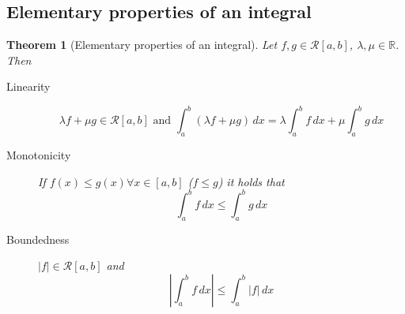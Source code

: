 \documentclass{article}
\newtheorem{theorem}{Theorem}  \numberwithin{theorem}{section}
\newcommand{\card}[1]{\left|#1\right|}
\begin{document}
\subsection{Elementary properties of an integral}

\begin{theorem}[Elementary properties of an integral]
  Let $f, g \in \mathcal R[a,b]$, $\lambda, \mu \in \mathbb R$.
  Then
  \begin{description}
    \item[Linearity]
      \[ \lambda f + \mu g \in \mathcal R[a,b] \text{ and } \int_a^b (\lambda f + \mu g) \, dx = \lambda \int_a^b f \, dx + \mu \int_a^b g \, dx \]
    \item[Monotonicity]
      If $f(x) \leq g(x) \forall x \in [a,b]$ ($f \leq g$) it holds that
      \[ \int_a^b f \, dx \leq \int_a^b g \, dx \]
    \item[Boundedness]
      $\card{f} \in \mathcal R[a,b]$  and
      \[ \card{\int_a^b f \, dx} \leq \int_a^b \card{f} \, dx \]
  \end{description}
\end{theorem}
\end{document}
